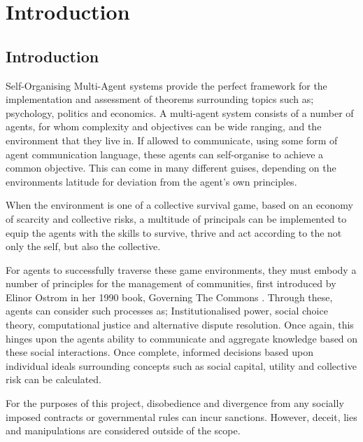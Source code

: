\chapter{Introduction}\label{introduction}

\section{Introduction}\label{sec:intro}
Self-Organising Multi-Agent systems provide the perfect framework for the implementation and assessment of theorems surrounding topics such as; psychology, politics and economics. A multi-agent system consists of a number of agents, for whom complexity and objectives can be wide ranging, and the environment that they live in. If allowed to communicate, using some form of agent communication language, these agents can self-organise to achieve a common objective. This can come in many different guises, depending on the environments latitude for deviation from the agent's own principles. 

When the environment is one of a collective survival game, based on an economy of scarcity and collective risks, a multitude of principals can be implemented to equip the agents with the skills to survive, thrive and act according to the not only the self, but also the collective. 

For agents to successfully traverse these game environments, they must embody a number of principles for the management of communities, first introduced by Elinor Ostrom in her 1990 book, Governing The Commons \cite{ostrom2015governing}. Through these, agents can consider such processes as; Institutionalised power, social choice theory, computational justice and alternative dispute resolution. Once again, this hinges upon the agents ability to communicate and aggregate knowledge based on these social interactions. Once complete, informed decisions based upon individual ideals surrounding concepts such as social capital, utility and collective risk can be calculated.

For the purposes of this project, disobedience and divergence from any socially imposed contracts or governmental rules can incur sanctions. However, deceit, lies and manipulations are considered outside of the scope. 

